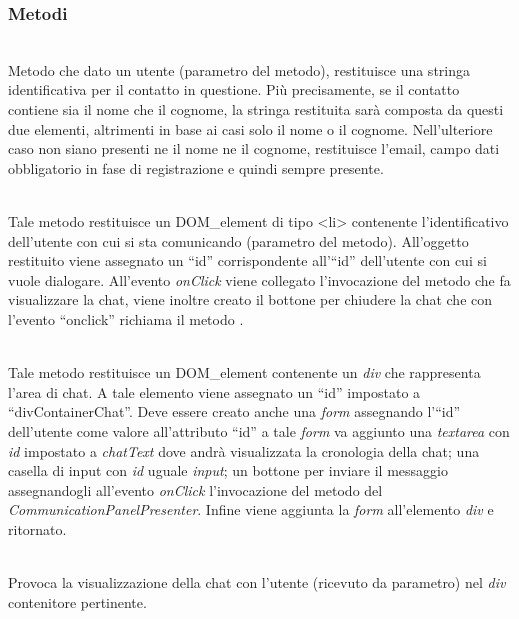 \subsubsection*{Metodi}
\begin{description}
\item{}\\
	Metodo che dato un utente (parametro del metodo), restituisce una stringa identificativa per il contatto in questione. Più precisamente, se il contatto contiene sia il nome che il cognome, la stringa restituita sarà composta da questi due elementi, altrimenti in base ai casi solo il nome o il cognome. Nell'ulteriore caso non siano presenti ne il nome ne il cognome, restituisce l'email, campo dati obbligatorio in fase di registrazione e quindi sempre presente.

\item{}\\
	Tale metodo restituisce un DOM\_element di tipo <li> contenente l'identificativo dell'utente con cui si sta comunicando (parametro del metodo). All'oggetto restituito viene assegnato un ``id'' corrispondente all'``id'' dell'utente con cui si vuole dialogare. All'evento \textit{onClick} viene collegato l'invocazione del metodo  che fa visualizzare la chat, viene inoltre creato il bottone per chiudere la chat che con l'evento ``onclick'' richiama il metodo .

\item{}\\
	Tale metodo restituisce un DOM\_element contenente un \textit{div} che rappresenta l'area di chat. A tale elemento viene assegnato un ``id'' impostato a ``divContainerChat''. Deve essere creato anche una \textit{form} assegnando l'``id'' dell'utente come valore all'attributo ``id'' a tale \textit{form} va aggiunto una \textit{textarea} con \textit{id} impostato a \textit{chatText} dove andrà visualizzata la cronologia della chat; una casella di input con \textit{id} uguale \textit{input}; un bottone per inviare il messaggio assegnandogli all'evento \textit{onClick} l'invocazione del metodo  del \textit{CommunicationPanelPresenter}. Infine viene aggiunta la \textit{form} all'elemento \textit{div} e ritornato.
	
\item{}\\
Provoca la visualizzazione della chat con l'utente (ricevuto da parametro) nel \textit{div} contenitore pertinente.


\end{description}
